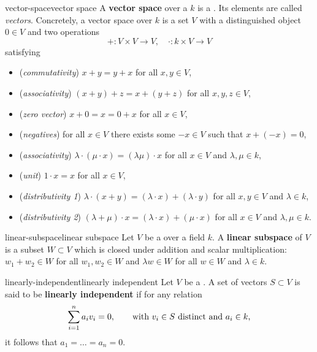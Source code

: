 \begin{topic}{vector-space}{vector space}
    A \textbf{vector space} over a  $k$ is a . Its elements are called \textit{vectors}.
    Concretely, a vector space over $k$ is a set $V$ with a distinguished object $0 \in V$ and two operations
    \[ + \colon V \times V \to V, \quad \cdot \colon k \times V \to V \]
    satisfying
    \begin{itemize}
        \item (\textit{commutativity}) $x + y = y + x$ for all $x, y \in V$,
        \item (\textit{associativity}) $(x + y) + z = x + (y + z)$ for all $x, y, z \in V$,
        \item (\textit{zero vector}) $x + 0 = x = 0 + x$ for all $x \in V$,
        \item (\textit{negatives}) for all $x \in V$ there exists some $-x \in V$ such that $x + (-x) = 0$,
        \item (\textit{associativity}) $\lambda \cdot (\mu \cdot x) = (\lambda \mu) \cdot x$ for all $x \in V$ and $\lambda, \mu \in k$,
        \item (\textit{unit}) $1 \cdot x = x$ for all $x \in V$,
        \item (\textit{distributivity 1}) $\lambda \cdot (x + y) = (\lambda \cdot x) + (\lambda \cdot y)$ for all $x, y \in V$ and $\lambda \in k$,
        \item (\textit{distributivity 2}) $(\lambda + \mu) \cdot x = (\lambda \cdot x) + (\mu \cdot x)$ for all $x \in V$ and $\lambda, \mu \in k$.
    \end{itemize}
\end{topic}

\begin{topic}{linear-subspace}{linear subspace}
    Let $V$ be a  over a field $k$. A \textbf{linear subspace} of $V$ is a subset $W \subset V$ which is closed under addition and scalar multiplication: $w_1 + w_2 \in W$ for all $w_1, w_2 \in W$ and $\lambda w \in W$ for all $w \in W$ and $\lambda \in k$.
\end{topic}

\begin{topic}{linearly-independent}{linearly independent}
    Let $V$ be a . A set of vectors $S \subset V$ is said to be \textbf{linearly independent} if for any relation
    \[ \sum_{i = 1}^{n} a_i v_i = 0, \qquad \textup{with $v_i \in S$ distinct and $a_i \in k$,} \]
    it follows that $a_1 = \ldots = a_n = 0$.
\end{topic}

